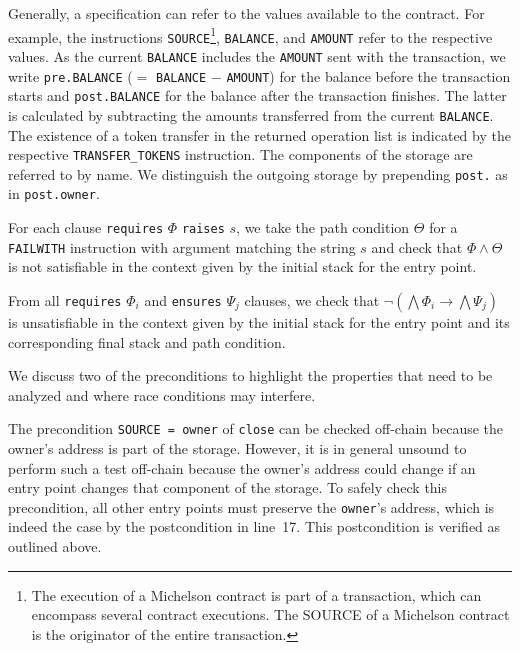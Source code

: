 \documentclass[a4paper,USenglish,american,cleveref, autoref, thm-restate]{oasics-v2021}
\begin{document}
Generally, a specification can refer to the values available to the contract. For example, the
instructions \lstinline/SOURCE/\footnote{The execution of a Michelson contract is part of
  a transaction, which can encompass several contract executions. The SOURCE of a Michelson contract
  is the originator of the entire transaction.}, \lstinline/BALANCE/, and \lstinline/AMOUNT/ refer
to the respective values. As the current \lstinline/BALANCE/ includes the \lstinline/AMOUNT/ sent
with the transaction, we write \lstinline/pre.BALANCE/ ($=$ \lstinline/BALANCE/ $-$
\lstinline/AMOUNT/) for the balance before the transaction starts and \lstinline/post.BALANCE/ for
the balance after the transaction finishes. The latter is calculated by subtracting the amounts
transferred from the current \lstinline/BALANCE/. The existence of a token transfer in the returned
operation list is indicated by
the respective \lstinline/TRANSFER_TOKENS/ instruction.  The components of the storage are referred
to by name. We distinguish the outgoing storage by prepending \lstinline/post./ as in
\lstinline/post.owner/.

For each clause \lstinline/requires/ $\Phi$ \lstinline/raises/ $s$, we take the path condition
$\Theta$ for a \lstinline/FAILWITH/ instruction with argument matching the string $s$ and check that
$\Phi \wedge \Theta$ is not satisfiable in the context given by the initial stack for the entry point.

From all \lstinline/requires/ $\Phi_i$ and \lstinline/ensures/ $\Psi_j$ clauses, we check that $\neg
(\bigwedge\Phi_i \to \bigwedge \Psi_j)$ is unsatisfiable in the context given by the initial stack
for the entry point and its corresponding final stack and path condition.

We discuss two of the preconditions to highlight the properties that 
need to be analyzed and where race conditions may interfere. 

The precondition \lstinline/SOURCE = owner/ of \lstinline/close/ can
be checked off-chain because the owner's address is part of the
storage. However, it is in general unsound to perform such a test
off-chain because the owner's address could change if an entry point
changes that component of the storage. To safely check this
precondition, all other entry points must preserve the \lstinline/owner/'s address, which is indeed
the case by the postcondition in line~17. This postcondition is verified as outlined above.

\end{document}

